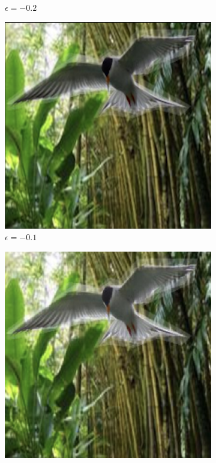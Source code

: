 \begin{figure}[!b]
\begin{subfigure}[b]{0.136\textwidth}
  \caption{$\epsilon = -0.2$}
  \label{fig:dark_02}
\end{subfigure}
\begin{subfigure}[b]{0.136\textwidth}
  \includegraphics[width=0.99\linewidth]{plotsAistats/bird_light_01_dark.png}
  \caption{$\epsilon = -0.1$}
  \label{fig:dark_01}
\end{subfigure}
\begin{subfigure}[b]{0.136\textwidth}
  \includegraphics[width=0.99\linewidth]{plotsAistats/waterbird_original_example.png}

\end{subfigure}
\end{figure}
